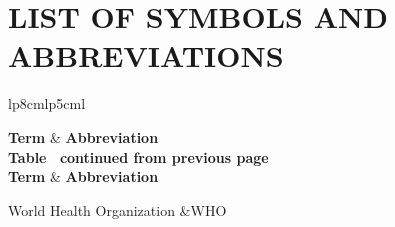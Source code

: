 \chapter*{LIST OF SYMBOLS AND ABBREVIATIONS}

{\singlespacing
	\begin{longtable}{lp{8cm}lp{5cm}l}
		
		\hline
		\textbf{Term}                                & \textbf{Abbreviation}    \\ \hline
		\endfirsthead
		{{\bfseries Table \thetable\ continued from previous page}} \\
		
		\hline
		\textbf{Term}                                & \textbf{Abbreviation}  \\ \hline
		\endhead

		World Health Organization	&WHO \\
	
	\end{longtable}
}

\clearpage
